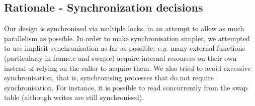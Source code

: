 \subsection{Rationale - Synchronization decisions}

Our design is synchronised via multiple locks, in an attempt to allow as much parallelism as possible.
In order to make synchronisation simpler, we attempted to use implicit synchronisation as far as possible; \textit{e.g.} many external functions (particularly in frame.c and swap.c) acquire internal resources on their own instead of relying on the caller to acquire them.
We also tried to avoid excessive synchronisation, that is, synchronising processes that do not require synchronisation. For instance, it is possible to read concurrently from the swap table (although writes are still synchronised).
